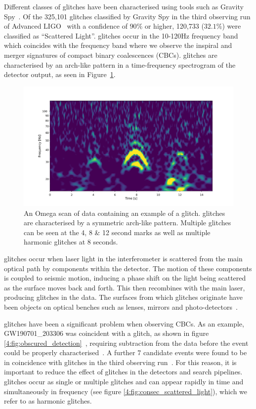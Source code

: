 Different classes of glitches have been characterised using tools such as Gravity Spy~\cite{gravityspy:2017, gravityspy:2023}. Of the 325,101 glitches classified by Gravity Spy in the third observing run of Advanced LIGO~\cite{gravityspy:2021} with a confidence of $90\%$ or higher, 120,733 ($32.1\%$) were classified as ``Scattered Light''. \Scladj glitches occur in the 10-120Hz frequency band~\cite{reducing_scattering:2020} which coincides with the frequency band where we observe the inspiral and merger signatures of compact binary coalescences (CBCs). \Scladj glitches are characterised by an arch-like pattern in a time-frequency spectrogram of the detector output, as seen in Figure~\ref{4:fig:scattered_light}. 
%
\begin{figure}
  \includegraphics[width=\textwidth]{images/4_archenemy/Section1/single_stack.pdf}
  \caption{An Omega scan \cite{gwdetchar_tools:2021} of \gwadj data containing an example of a \scladj glitch. \Scladj glitches are characterised by a symmetric arch-like pattern. Multiple \scladj glitches can be seen at the 4, 8 \& 12 second marks as well as multiple harmonic glitches at 8 seconds.}
  \label{4:fig:scattered_light}
\end{figure}
%
\Scladj glitches occur when laser light in the interferometer is scattered from the main optical path by components within the detector. The motion of these components is coupled to seismic motion, inducing a phase shift on the light being scattered as the surface moves back and forth. This \scl then recombines with the main laser, producing \scladj glitches in the data. The surfaces from which \scladj glitches originate have been objects on optical benches such as lenses, mirrors and photo-detectors~\cite{TAccadia:2010}.

\Scladj glitches have been a significant problem when observing CBCs. As an example, GW190701\_203306 was coincident with a \scladj glitch, as shown in figure \ref{4:fig:obscured_detection}~\cite{gwtc2:2021}, requiring subtraction from the data before the event could be properly characterised~\cite{O3_subtraction:2022}. A further 7 candidate events were found to be in coincidence with \scladj glitches in the third observing run~\cite{gwtc3:2023}. For this reason, it is important to reduce the effect of \scladj glitches in the detectors and \gwadj search pipelines. \Scladj glitches occur as single or multiple glitches and can appear rapidly in time and simultaneously in frequency (see figure \ref{4:fig:consec_scattered_light}), which we refer to as harmonic glitches.

